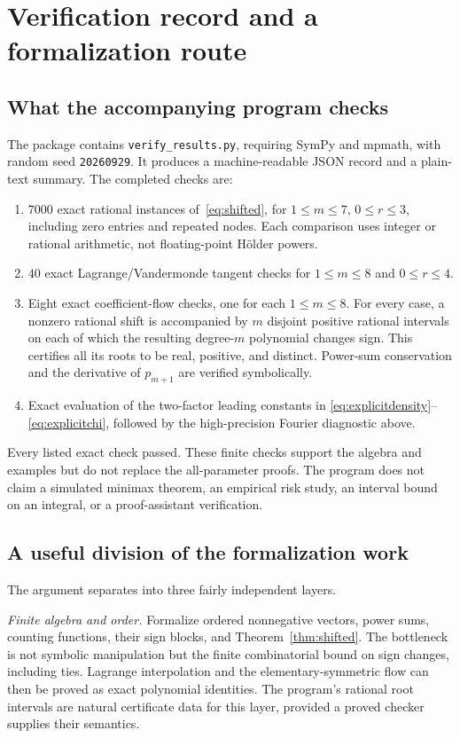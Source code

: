 \documentclass[11pt,a4paper]{article}
\numberwithin{equation}{section}
\theoremstyle{definition}
\theoremstyle{remark}
\begin{document}
\section{Verification record and a formalization route}
\label{sec:verification}

\subsection{What the accompanying program checks}
The package contains \texttt{verify\_results.py}, requiring SymPy and mpmath,
with random seed \texttt{20260929}. It produces a machine-readable JSON record
and a plain-text summary. The completed checks are:
\begin{enumerate}
\item $7000$ exact rational instances of~\eqref{eq:shifted}, for
$1\le m\le7$, $0\le r\le3$, including zero entries and repeated nodes.
Each comparison uses integer or rational arithmetic, not floating-point
H\"older powers.
\item $40$ exact Lagrange/Vandermonde tangent checks for $1\le m\le8$ and
$0\le r\le4$.
\item Eight exact coefficient-flow checks, one for each $1\le m\le8$.
For every case, a nonzero rational shift is accompanied by $m$ disjoint
positive rational intervals on each of which the resulting degree-$m$
polynomial changes sign. This certifies all its roots to be real, positive,
and distinct. Power-sum conservation and the derivative of $p_{m+1}$ are
verified symbolically.
\item Exact evaluation of the two-factor leading constants in
\eqref{eq:explicitdensity}--\eqref{eq:explicitchi}, followed by the
high-precision Fourier diagnostic above.
\end{enumerate}
Every listed exact check passed. These finite checks support the algebra and
examples but do not replace the all-parameter proofs. The program does not
claim a simulated minimax theorem, an empirical risk study, an interval bound
on an integral, or a proof-assistant verification.

\subsection{A useful division of the formalization work}
The argument separates into three fairly independent layers.

\emph{Finite algebra and order.} Formalize ordered nonnegative vectors,
power sums, counting functions, their sign blocks, and
Theorem~\ref{thm:shifted}. The bottleneck is not symbolic manipulation but the
finite combinatorial bound on sign changes, including ties. Lagrange
interpolation and the elementary-symmetric flow can then be proved as exact
polynomial identities. The program's rational root intervals are natural
certificate data for this layer, provided a proved checker supplies their
semantics.
\end{document}
